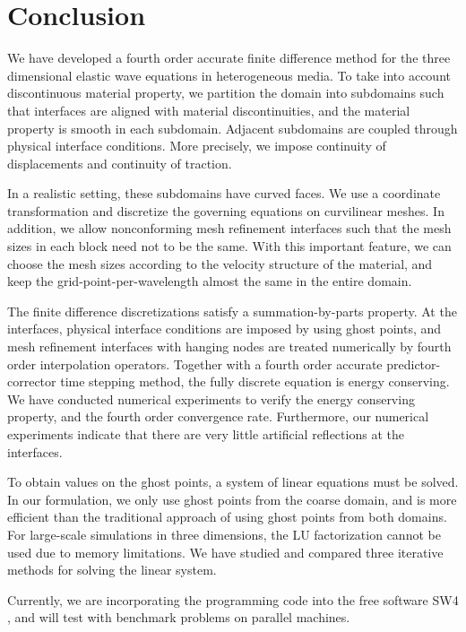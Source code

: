 \section{Conclusion}
We have developed a fourth order accurate finite difference method for the three dimensional elastic wave equations in heterogeneous media. To take into account discontinuous material property, we partition the domain into subdomains such that interfaces are aligned with material discontinuities, and the material property is smooth in each subdomain. Adjacent subdomains are coupled through physical interface conditions. More precisely, we impose continuity of displacements and continuity of traction. 

In a realistic setting, these subdomains have curved faces. We use a coordinate transformation and discretize the governing equations on curvilinear meshes. In addition, we allow nonconforming mesh refinement interfaces such that the mesh sizes in each block need not to be the same. With this important feature, we can choose the mesh sizes according to the velocity structure of the material, and keep the grid-point-per-wavelength almost the same in the entire domain. 

The finite difference discretizations satisfy a summation-by-parts property. At the interfaces, physical interface conditions are imposed by using ghost points, and mesh refinement interfaces with hanging nodes are treated numerically by fourth order interpolation operators. Together with a fourth order accurate predictor-corrector time stepping method, the fully discrete equation is energy conserving. We have conducted numerical experiments to verify the energy conserving property, and the fourth order convergence rate. Furthermore, our numerical experiments indicate that there are very little artificial reflections at the interfaces.

To obtain values on the ghost points, a system of linear equations must be solved. In our formulation, we only use ghost points from the coarse domain, and is more efficient than the traditional approach of using ghost points from both domains.  For large-scale simulations in three dimensions, the LU factorization cannot be used due to memory limitations. We have studied and compared three iterative methods for solving the linear system.

Currently, we are incorporating the programming code into the free software SW4 \cite{SW4}, and will test with benchmark problems on parallel machines. 